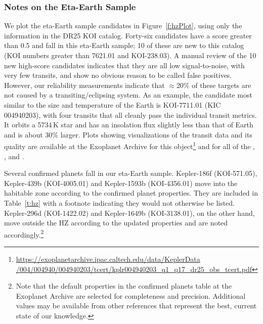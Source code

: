 \subsubsection{Notes on the Eta-Earth Sample}
We plot the eta-Earth sample candidates in Figure~\ref{f:hzPlot}, using only the information in the DR25 KOI catalog.  Forty-six candidates have a score greater than 0.5 and fall in this eta-Earth sample; 10 of these are new to this catalog (KOI numbers greater than 7621.01 and KOI-238.03).  A manual review of the 10 new high-score candidates indicates that they are all low signal-to-noise, with very few transits, and show no obvious reason to be called false positives. However, our reliability measurements indicate that $\approx$20\% of these targets are not caused by a transiting/eclipsing system. As an example, the candidate most similar to the size and temperature of the Earth is KOI-7711.01 (KIC 004940203), with four transits that all cleanly pass the individual transit metrics. It orbits a 5734\,K star and has an insolation flux slightly less than that of Earth and is about 30\% larger.  Plots showing visualizations of the transit data and its quality are available at the Exoplanet Archive for this object\footnote{\url{https://exoplanetarchive.ipac.caltech.edu/data/KeplerData /004/004940/004940203/tcert/kplr004940203\_q1\_q17\_dr25\_obs\_tcert.pdf}} and for all of the , ,  and .

Several confirmed planets fall in our eta-Earth sample.  Kepler-186f (KOI-571.05), Kepler-439b (KOI-4005.01) and Kepler-1593b (KOI-4356.01) move into the habitable zone according to the confirmed planet properties. They are included in Table~\ref{t:hz} with a footnote indicating they would not otherwise be listed. Kepler-296d (KOI-1422.02) and Kepler-1649b (KOI-3138.01), on the other hand, move outside the HZ according to the updated properties and are noted accordingly.\footnote{Note that the default properties in the confirmed planets table at the Exoplanet Archive are selected for completeness and precision. Additional values may be available from other references that represent the best, current state of our knowledge.} 

